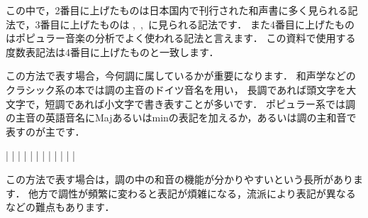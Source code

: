 \documentclass[dvipdfmx,uplatex,b5paper,openany,jbase=12Q,nomag*,textwidth-limit=44%
               ]{gachimuchi}[2020/05/05]
\begin{document}
この中で，2番目に上げたものは日本国内で刊行された和声書に多く見られる記法で，3番目に上げたものは
,\ \cite{chSHIMAOKA1ii},\ \cite{chSHIMAOKA1iii}に見られる記法です．
また4番目に上げたものはポピュラー音楽の分析でよく使われる記法と言えます．
この資料で使用する度数表記法は4番目に上げたものと一致します．

この方法で表す場合，今何調に属しているかが重要になります．
和声学などのクラシック系の本では調の主音のドイツ音名を用い，
長調であれば頭文字を大文字で，短調であれば小文字で書き表すことが多いです．
ポピュラー系では調の主音の英語音名にMajあるいはminの表記を加えるか，あるいは調の主和音で表すのが主です．

\begin{Music}
  \Startpiece%
  \Notes%
  \zchordsl{\Gni}\cchordsu{}|%
  \en%
  \Notes%
  \zchordsl{\Gni}\figbassu[6]|%
  \en%
  \Notes%
  \zchordsl{\Gni}\figbassu[4][6]|%
  \en\doublebar%
  \Notes%
  \zchordsl{\Gni}|%
  \en%
  \Notes%
  |%
  \en%
  \Notes%
  |%
  \en\doublebar%
  \Notes%
  \zchordsl{\Gni}|%
  \en%
  \Notes%
  |%
  \en%
  \Notes%
  |%
  \en\doublebar%
  \Notes%
  \zchordsl{\Gni}|%
  \en%
  \Notes%
  \zchordsl{\Gni/\Gniii}|%
  \en%
  \Notes%
  \zchordsl{\Gni/\Gnv}|%
  \en\setdoublebar%
  \endpiece%
\end{Music}

この方法で表す場合は，調の中の和音の機能が分かりやすいという長所があります．
他方で調性が頻繁に変わると表記が煩雑になる，流派により表記が異なるなどの難点もあります．
\end{document}
